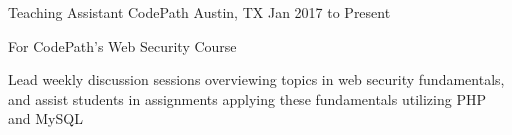 \begin{cventries}
	\cventry
		{Teaching Assistant}
		{CodePath}
		{Austin, TX}
		{Jan 2017 to Present}
		{
			\begin{cvitems}
				\item {For CodePath's Web Security Course}
				\item {Lead weekly discussion sessions overviewing topics in web security fundamentals, and assist students in assignments applying these fundamentals utilizing PHP and MySQL}
			\end{cvitems}
		}
\end{cventries}